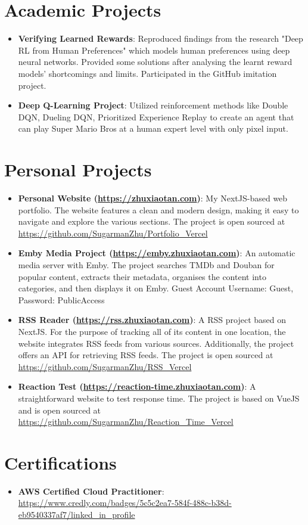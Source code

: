 \documentclass[letterpaper,11pt]{article}
\newcommand{\resumeItem}[2]{
  \item\small{
    \textbf{#1}{: #2 \vspace{-2pt}}
  }
}
\newcommand{\resumeSubItem}[2]{\resumeItem{#1}{#2}\vspace{-4pt}}
\newcommand{\resumeSubHeadingListStart}{\begin{itemize}[leftmargin=*]}
\newcommand{\resumeSubHeadingListEnd}{\end{itemize}}
\begin{document}
\section{Academic Projects}
\resumeSubHeadingListStart
\resumeSubItem{Verifying Learned Rewards}{Reproduced findings from the research "Deep RL from Human Preferences" which models human preferences using deep neural networks. Provided some solutions after analysing the learnt reward models' shortcomings and limits. Participated in the GitHub imitation project.}
\resumeSubItem{Deep Q-Learning Project}{Utilized reinforcement methods like Double DQN, Dueling DQN, Prioritized Experience Replay to create an agent that can play Super Mario Bros at a human expert level with only pixel input.}
\resumeSubHeadingListEnd

\section{Personal Projects}
\resumeSubHeadingListStart
\resumeSubItem{Personal Website (\url{https://zhuxiaotan.com})}{My NextJS-based web portfolio. The website features a clean and modern design, making it easy to navigate and explore the various sections. The project is open sourced at \url{https://github.com/SugarmanZhu/Portfolio_Vercel}}
\resumeSubItem{Emby Media Project (\url{https://emby.zhuxiaotan.com})}{An automatic media server with Emby. The project searches TMDb and Douban for popular content, extracts their metadata, organises the content into categories, and then displays it on Emby. Guest Account Username: Guest, Password: PublicAccess}
\resumeSubItem{RSS Reader (\url{https://rss.zhuxiaotan.com})}{A RSS project based on NextJS. For the purpose of tracking all of its content in one location, the website integrates RSS feeds from various sources. Additionally, the project offers an API for retrieving RSS feeds. The project is open sourced at \url{https://github.com/SugarmanZhu/RSS_Vercel}}
\resumeSubItem{Reaction Test (\url{https://reaction-time.zhuxiaotan.com})}{A straightforward website to test response time. The project is based on VueJS and is open sourced at \url{https://github.com/SugarmanZhu/Reaction_Time_Vercel}}
\resumeSubHeadingListEnd

\section{Certifications}
\resumeSubHeadingListStart
\resumeSubItem{AWS Certified Cloud Practitioner}{\url{https://www.credly.com/badges/5c5c2ea7-584f-488c-b38d-eb9540337af7/linked_in_profile}}
\resumeSubHeadingListEnd
\end{document}
